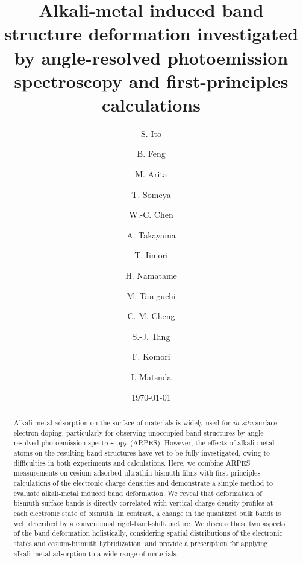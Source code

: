 \documentclass[reprint,secnumarabic,amssymb, nobibnotes, aps, prl,superscriptaddress,showpacs]{revtex4-1}
\begin{document}
\title{Alkali-metal induced band structure deformation investigated by angle-resolved photoemission spectroscopy and first-principles calculations}
\author{S. Ito}
\author{B. Feng}
\author{M. Arita}
\author{T. Someya}
\author{W.-C. Chen}
\author{A. Takayama}
\author{T. Iimori}
\author{H. Namatame}
\author{M. Taniguchi}
\author{C.-M. Cheng}
\author{S.-J. Tang}
\author{F. Komori}
\author{I. Matsuda}
\date{\today}
\begin{abstract}

Alkali-metal adsorption on the surface of materials is widely used for \textit{in situ} surface electron doping, particularly for observing unoccupied band structures by angle-resolved photoemission spectroscopy (ARPES). However, the effects of alkali-metal atoms on the resulting band structures have yet to be fully investigated, owing to difficulties in both experiments and calculations. Here, we combine ARPES measurements on cesium-adsorbed ultrathin bismuth films with first-principles calculations of the electronic charge densities and demonstrate a simple method to evaluate alkali-metal induced band deformation. We reveal that deformation of bismuth surface bands is directly correlated with vertical charge-density profiles at each electronic state of bismuth. In contrast, a change in the quantized bulk bands is well described by a conventional rigid-band-shift picture. We discuss these two aspects of the band deformation holistically, considering spatial distributions of the electronic states and cesium-bismuth hybridization, and provide a prescription for applying alkali-metal adsorption to a wide range of materials.
\end{abstract}
\end{document}
